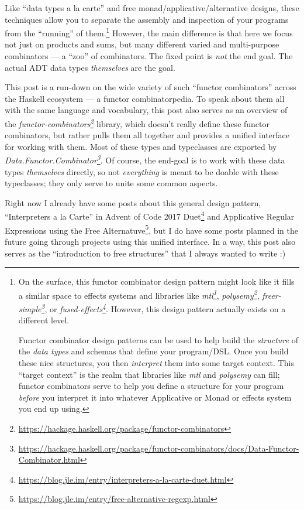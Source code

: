 \documentclass[]{article}
\renewcommand{\href}[2]{#2\footnote{\url{#1}}}
\begin{document}
Like ``data types a la carte'' and free monad/applicative/alternative designs,
these techniques allow you to separate the assembly and inspection of your
programs from the ``running'' of them.\footnote{On the surface, this functor
  combinator design pattern might look like it fills a similar space to effects
  systems and libraries like
  \emph{\href{https://hackage.haskell.org/package/mtl}{mtl}},
  \emph{\href{https://hackage.haskell.org/package/polysemy}{polysemy}},
  \emph{\href{https://hackage.haskell.org/package/freer-simple}{freer-simple}},
  or
  \emph{\href{https://hackage.haskell.org/package/fused-effects}{fused-effects}}.
  However, this design pattern actually exists on a different level.

  Functor combinator design patterns can be used to help build the
  \emph{structure} of the \emph{data types} and schemas that define your
  program/DSL. Once you build these nice structures, you then \emph{interpret}
  them into some target context. This ``target context'' is the realm that
  libraries like \emph{mtl} and \emph{polysemy} can fill; functor combinators
  serve to help you define a structure for your program \emph{before} you
  interpret it into whatever Applicative or Monad or effects system you end up
  using.} However, the main difference is that here we focus not just on
products and sums, but many different varied and multi-purpose combinators --- a
``zoo'' of combinators. The fixed point is \emph{not} the end goal. The actual
ADT data types \emph{themselves} are the goal.

This post is a run-down on the wide variety of such ``functor combinators''
across the Haskell ecosystem --- a functor combinatorpedia. To speak about them
all with the same language and vocabulary, this post also serves as an overview
of the
\emph{\href{https://hackage.haskell.org/package/functor-combinators}{functor-combinators}}
library, which doesn't really define these functor combinators, but rather pulls
them all together and provides a unified interface for working with them. Most
of these types and typeclasses are exported by
\emph{\href{https://hackage.haskell.org/package/functor-combinators/docs/Data-Functor-Combinator.html}{Data.Functor.Combinator}}.
Of course, the end-goal is to work with these data types \emph{themselves}
directly, so not \emph{everything} is meant to be doable with these typeclasses;
they only serve to unite some common aspects.

Right now I already have some posts about this general design pattern,
\href{https://blog.jle.im/entry/interpreters-a-la-carte-duet.html}{``Interpreters
a la Carte'' in Advent of Code 2017 Duet} and
\href{https://blog.jle.im/entry/free-alternative-regexp.html}{Applicative
Regular Expressions using the Free Alternatuve}, but I do have some posts
planned in the future going through projects using this unified interface. In a
way, this post also serves as the ``introduction to free structures'' that I
always wanted to write :)
\end{document}
